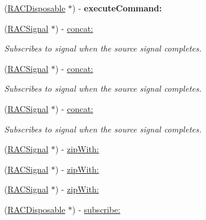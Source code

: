 \begin{DoxyCompactItemize}
(\mbox{\hyperlink{interface_r_a_c_disposable}{R\+A\+C\+Disposable}} $\ast$) -\/ {\bfseries execute\+Command\+:}
\item 
\mbox{\label{interface_r_a_c_signal_a7d49c1cd1eedbe5737835ad1a07075dd}} 
(\mbox{\hyperlink{interface_r_a_c_signal}{R\+A\+C\+Signal}} $\ast$) -\/ \mbox{\hyperlink{interface_r_a_c_signal_a7d49c1cd1eedbe5737835ad1a07075dd}{concat\+:}}
\begin{DoxyCompactList}\small\item\em Subscribes to {\ttfamily signal} when the source signal completes. \end{DoxyCompactList}\item 
\mbox{\label{interface_r_a_c_signal_a7d49c1cd1eedbe5737835ad1a07075dd}} 
(\mbox{\hyperlink{interface_r_a_c_signal}{R\+A\+C\+Signal}} $\ast$) -\/ \mbox{\hyperlink{interface_r_a_c_signal_a7d49c1cd1eedbe5737835ad1a07075dd}{concat\+:}}
\begin{DoxyCompactList}\small\item\em Subscribes to {\ttfamily signal} when the source signal completes. \end{DoxyCompactList}\item 
\mbox{\label{interface_r_a_c_signal_a7d49c1cd1eedbe5737835ad1a07075dd}} 
(\mbox{\hyperlink{interface_r_a_c_signal}{R\+A\+C\+Signal}} $\ast$) -\/ \mbox{\hyperlink{interface_r_a_c_signal_a7d49c1cd1eedbe5737835ad1a07075dd}{concat\+:}}
\begin{DoxyCompactList}\small\item\em Subscribes to {\ttfamily signal} when the source signal completes. \end{DoxyCompactList}\item 
(\mbox{\hyperlink{interface_r_a_c_signal}{R\+A\+C\+Signal}} $\ast$) -\/ \mbox{\hyperlink{interface_r_a_c_signal_ac822f657df311327de76bc55bcae689d}{zip\+With\+:}}
\item 
(\mbox{\hyperlink{interface_r_a_c_signal}{R\+A\+C\+Signal}} $\ast$) -\/ \mbox{\hyperlink{interface_r_a_c_signal_ac822f657df311327de76bc55bcae689d}{zip\+With\+:}}
\item 
(\mbox{\hyperlink{interface_r_a_c_signal}{R\+A\+C\+Signal}} $\ast$) -\/ \mbox{\hyperlink{interface_r_a_c_signal_ac822f657df311327de76bc55bcae689d}{zip\+With\+:}}
\item 
(\mbox{\hyperlink{interface_r_a_c_disposable}{R\+A\+C\+Disposable}} $\ast$) -\/ \mbox{\hyperlink{interface_r_a_c_signal_aeab76d632d98bbc321ec5e19575377eb}{subscribe\+:}}

\end{DoxyCompactItemize}
